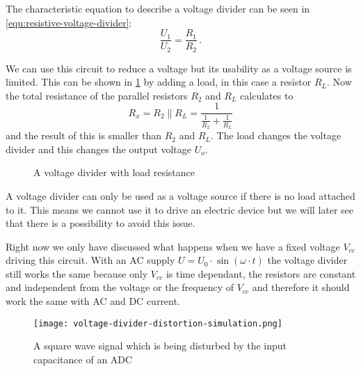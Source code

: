 The characteristic equation to describe a voltage divider can be seen in \cref{equ:resistive-voltage-divider}:
\begin{equation}
	\frac{U_1}{U_2} = \frac{R_1}{R_2}\,.
	\label{equ:resistive-voltage-divider}
\end{equation}

We can use this circuit to reduce a voltage but its usability as a voltage source is limited. This can be shown in \cref{fig:loaded-voltage-divider} by adding a load, in this case a resistor $R_L$. Now the total resistance of the parallel resistors $R_2$ and $R_L$ calculates to
\begin{equation*}
	R_x = R_2 \parallel R_L = \frac{1}{\frac{1}{R_2} + \frac{1}{R_L}}
\end{equation*}
and the result of this is smaller than $R_2$ and $R_L$. The load changes the voltage divider and this changes the output voltage $U_o$.


\begin{figure}[htb]
	\centering
	\caption{A voltage divider with load resistance}
	\label{fig:loaded-voltage-divider}
\end{figure}

A voltage divider can only be used as a voltage source if there is no load attached to it. This means we cannot use it to drive an electric device but we will later see that there is a possibility to avoid this issue.

Right now we only have discussed what happens when we have a fixed voltage $V_{cc}$ driving this circuit. With an AC supply $U = U_0 \cdot \sin(\omega \cdot t)$ the voltage divider still works the same because only $V_{cc}$ is time dependant, the resistors are constant and independent from the voltage or the frequency of $V_{cc}$ and therefore it should work the same with AC and DC current.

\begin{figure}[htb]
		\centering
		\texttt{[image: voltage-divider-distortion-simulation.png]}
		\caption{A square wave signal which is being disturbed by the input capacitance of an ADC}
		\label{fig:voltage-divider-distortion}
\end{figure}

